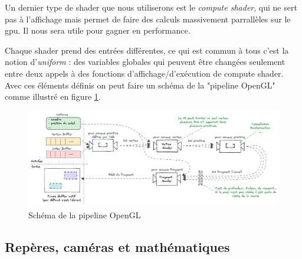 \documentclass[11pt]{article} %
\begin{document}
Un dernier type de shader que nous utiliserons est le \textit{compute shader}, qui ne sert pas à l'affichage mais permet de faire des calculs massivement parrallèles sur le gpu. Il nous sera utile pour gagner en performance.
\par
Chaque shader prend des entrées différentes, ce qui est commun à tous c'est la notion d'\textit{uniform} : des variables globales qui peuvent être changées seulement entre deux appels à des fonctions d'affichage/d'exécution de compute shader.
Avec ces éléments définis on peut faire un schéma de la "pipeline OpenGL"  comme illustré en figure \ref{fig:opengl_pipeline}.

\begin{figure}[h]
	\centering
	\includegraphics[scale=.3]{opengl_pipeline}
	\caption{Schéma de la pipeline OpenGL}
	\label{fig:opengl_pipeline}
\end{figure}

\subsection{Repères, caméras et mathématiques}
\end{document}
